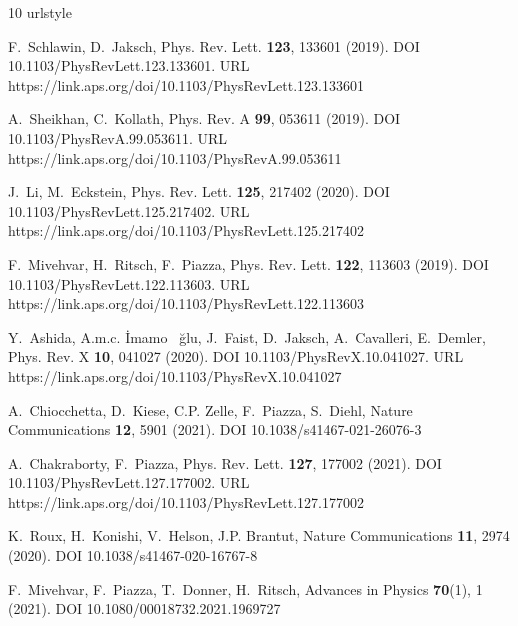 \begin{thebibliography}{10}
\providecommand{\url}[1]{{#1}}
\providecommand{\urlprefix}{URL }
\expandafter\ifx\csname urlstyle\endcsname\relax
  \providecommand{\doi}[1]{DOI \discretionary{}{}{}#1}\else
  \providecommand{\doi}{DOI \discretionary{}{}{}\begingroup
  \urlstyle{rm}\Url}\fi

F.~Schlawin, D.~Jaksch, Phys. Rev. Lett. \textbf{123}, 133601 (2019).
\newblock \doi{10.1103/PhysRevLett.123.133601}.
\newblock
  \urlprefix\url{https://link.aps.org/doi/10.1103/PhysRevLett.123.133601}

A.~Sheikhan, C.~Kollath, Phys. Rev. A \textbf{99}, 053611 (2019).
\newblock \doi{10.1103/PhysRevA.99.053611}.
\newblock \urlprefix\url{https://link.aps.org/doi/10.1103/PhysRevA.99.053611}

J.~Li, M.~Eckstein, Phys. Rev. Lett. \textbf{125}, 217402 (2020).
\newblock \doi{10.1103/PhysRevLett.125.217402}.
\newblock
  \urlprefix\url{https://link.aps.org/doi/10.1103/PhysRevLett.125.217402}

F.~Mivehvar, H.~Ritsch, F.~Piazza, Phys. Rev. Lett. \textbf{122}, 113603
  (2019).
\newblock \doi{10.1103/PhysRevLett.122.113603}.
\newblock
  \urlprefix\url{https://link.aps.org/doi/10.1103/PhysRevLett.122.113603}

Y.~Ashida, A.m.c. \ifmmode {}\else \.{I}\fi{}mamo\ifmmode~\else
  \u{g}\fi{}lu, J.~Faist, D.~Jaksch, A.~Cavalleri, E.~Demler, Phys. Rev. X
  \textbf{10}, 041027 (2020).
\newblock \doi{10.1103/PhysRevX.10.041027}.
\newblock \urlprefix\url{https://link.aps.org/doi/10.1103/PhysRevX.10.041027}

A.~{Chiocchetta}, D.~{Kiese}, C.P. {Zelle}, F.~{Piazza}, S.~{Diehl}, Nature
  Communications \textbf{12}, 5901 (2021).
\newblock \doi{10.1038/s41467-021-26076-3}

A.~Chakraborty, F.~Piazza, Phys. Rev. Lett. \textbf{127}, 177002 (2021).
\newblock \doi{10.1103/PhysRevLett.127.177002}.
\newblock
  \urlprefix\url{https://link.aps.org/doi/10.1103/PhysRevLett.127.177002}

K.~{Roux}, H.~{Konishi}, V.~{Helson}, J.P. {Brantut}, Nature Communications
  \textbf{11}, 2974 (2020).
\newblock \doi{10.1038/s41467-020-16767-8}

F.~{Mivehvar}, F.~{Piazza}, T.~{Donner}, H.~{Ritsch}, Advances in Physics
  \textbf{70}(1), 1 (2021).
\newblock \doi{10.1080/00018732.2021.1969727}


\end{thebibliography}
